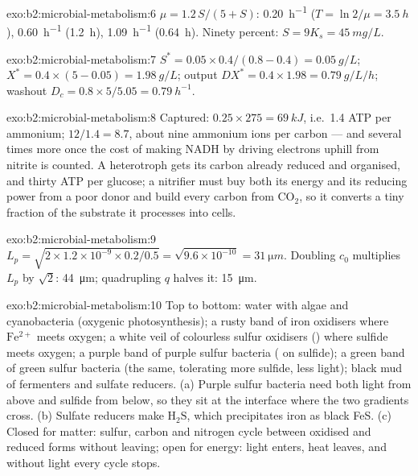 \begin{solution}{exo:b2:microbial-metabolism:6}
$\mu = 1.2\,S/(5 + S)$: \qty{0.20}{h^{-1}} ($T = \ln 2/\mu =
\qty{3.5}{h}$), \qty{0.60}{h^{-1}} (\qty{1.2}{h}), \qty{1.09}{h^{-1}}
(\qty{0.64}{h}). Ninety percent: $S = 9K_s = \qty{45}{mg/L}$.
\end{solution}

\begin{solution}{exo:b2:microbial-metabolism:7}
$S^* = 0.05\times 0.4/(0.8 - 0.4) = \qty{0.05}{g/L}$; $X^* =
0.4\times(5 - 0.05) = \qty{1.98}{g/L}$; output $DX^* = 0.4\times
1.98 = \qty{0.79}{g/L/h}$; washout $D_c = 0.8\times 5/5.05 =
\qty{0.79}{h^{-1}}$.
\end{solution}

\begin{solution}{exo:b2:microbial-metabolism:8}
Captured: $0.25\times 275 = \qty{69}{kJ}$, i.e.\ 1.4 ATP per
ammonium; $12/1.4 = 8.7$, about nine ammonium ions per carbon --- and
several times more once the cost of making NADH by driving electrons
uphill from nitrite is counted. A heterotroph gets its carbon already
reduced and organised, and thirty ATP per glucose; a nitrifier must
buy both its energy and its reducing power from a poor donor and
build every carbon from $\mathrm{CO_2}$, so it converts a tiny
fraction of the substrate it processes into cells.
\end{solution}

\begin{solution}{exo:b2:microbial-metabolism:9}
$L_p = \sqrt{2\times 1.2\times 10^{-9}\times 0.2/0.5} =
\sqrt{9.6\times 10^{-10}} = \qty{31}{\micro m}$. Doubling $c_0$
multiplies $L_p$ by $\sqrt 2$: \qty{44}{\micro m}; quadrupling $q$
halves it: \qty{15}{\micro m}.
\end{solution}

\begin{solution}{exo:b2:microbial-metabolism:10}
Top to bottom: water with algae and cyanobacteria (oxygenic
photosynthesis); a rusty band of iron oxidisers where $\mathrm{Fe^{2+}}$
meets oxygen; a white veil of colourless sulfur oxidisers
() where sulfide meets oxygen; a purple band of
purple sulfur bacteria ( on sulfide); a
green band of green sulfur bacteria (the same, tolerating more
sulfide, less light); black mud of fermenters and sulfate reducers.
(a) Purple sulfur bacteria need both light from above and sulfide
from below, so they sit at the interface where the two gradients
cross. (b) Sulfate reducers make $\mathrm{H_2S}$, which precipitates
iron as black FeS. (c) Closed for matter: sulfur, carbon and nitrogen
cycle between oxidised and reduced forms without leaving; open for
energy: light enters, heat leaves, and without light every cycle
stops.
\end{solution}

